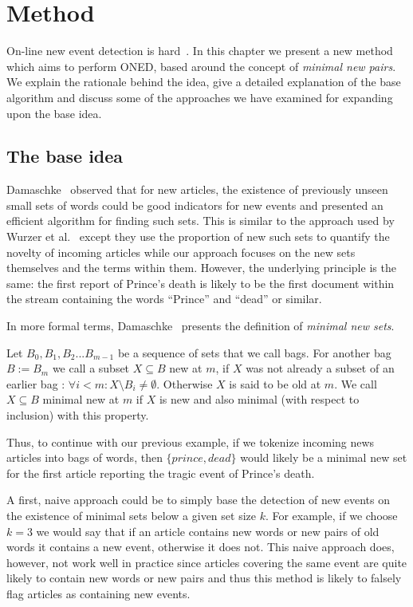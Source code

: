 \chapter{Method}
\label{chapter:method}
On-line new event detection is hard~\cite{allan2000hard}. In this chapter we present a new method which aims to perform ONED, based around the concept of \emph{minimal new pairs}. We explain the rationale behind the idea, give a detailed explanation of the base algorithm and discuss some of the approaches we have examined for expanding upon the base idea.


\section{The base idea}
\label{section:idea}
Damaschke~\cite{damaschke2015pairs} observed that for new articles, the existence of previously unseen small sets of words could be good indicators for new events and presented an efficient algorithm for finding such sets. This is similar to the approach used by Wurzer et al.~\cite{wurzer2015kterm} except they use the proportion of new such sets to quantify the novelty of incoming articles while our approach focuses on the new sets themselves and the terms within them. However, the underlying principle is the same: the first report of Prince's death is likely to be the first document within the stream containing the words ``Prince'' and ``dead'' or similar. 

In more formal terms, Damaschke~\cite{damaschke2015pairs} presents the definition of \emph{minimal new sets}. 

\begin{definition}
  Let $B_0, B_1, B_2...B_{m-1}$ be a sequence of sets that we call bags. For another bag $B:=B_{m}$ we call a subset $X \subseteq B$ new at $m$, if $X$ was not already a subset of an earlier bag : $\forall i < m : X \setminus B_{i} \neq \emptyset$. Otherwise $X$ is said to be old at $m$. We call $X \subseteq B$ minimal new at $m$ if $X$ is new and also minimal (with respect to inclusion) with this property.
\end{definition}

Thus, to continue with our previous example, if we tokenize incoming news articles into bags of words, then $\{prince, dead\}$ would likely be a minimal new set for the first article reporting the tragic event of Prince's death.

A first, naive approach could be to simply base the detection of new events on the existence of minimal sets below a given set size $k$. For example, if we choose $k=3$ we would say that if an article contains new words or new pairs of old words it contains a new event, otherwise it does not. This naive approach does, however, not work well in practice since articles covering the same event are quite likely to contain new words or new pairs and thus this method is likely to falsely flag articles as containing new events.

